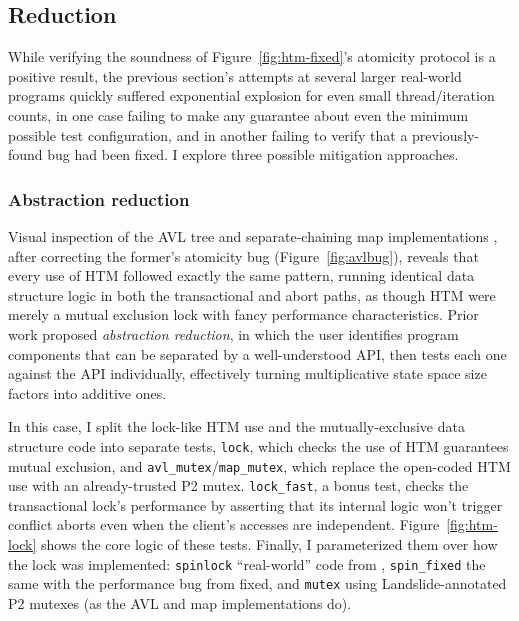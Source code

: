 
\subsection{Reduction}

While verifying the soundness of Figure~\ref{fig:htm-fixed}'s atomicity protocol is a positive result,
the previous section's attempts at several larger real-world programs quickly suffered exponential explosion
for even small thread/iteration counts,
in one case failing to make any guarantee about even the minimum possible test configuration,
and in another failing to verify that a previously-found bug had been fixed.
I explore three possible mitigation approaches.

\subsubsection{Abstraction reduction}

Visual inspection of the AVL tree and separate-chaining map implementations \cite{tm-benchmark-cmu},
after correcting the former's atomicity bug (Figure~\ref{fig:avlbug}),
reveals that every use of HTM followed exactly the same pattern,
running identical data structure logic in both the transactional and abort paths,
as though HTM were merely a mutual exclusion lock with fancy performance characteristics.
Prior work \cite{dbug-phdthesis} proposed {\em abstraction reduction},
in which the user identifies program components that can be separated by a well-understood API,
then tests each one against the API individually,
effectively turning multiplicative state space size factors into additive ones.

In this case, I split the lock-like HTM use
and the mutually-exclusive data structure code
into separate tests,
{\tt lock}, which checks the use of HTM guarantees mutual exclusion,
and {\tt avl\_mutex}/{\tt map\_mutex},
which replace the open-coded HTM use with an already-trusted P2 mutex.
{\tt lock\_fast},
a bonus test,
checks the transactional lock's performance by asserting that
its internal logic won't trigger conflict aborts
even when the client's accesses are independent.
Figure~\ref{fig:htm-lock} shows the core logic of these tests.
Finally, I parameterized them over how the lock was implemented:
{\tt spinlock} ``real-world'' code from \cite{spinlock-rtm-github},
{\tt spin\_fixed} the same with the performance bug from \sect{\ref{sec:tm-eval-bugs}} fixed,
and {\tt mutex} using Landslide-annotated P2 mutexes (as the AVL and map implementations do).

